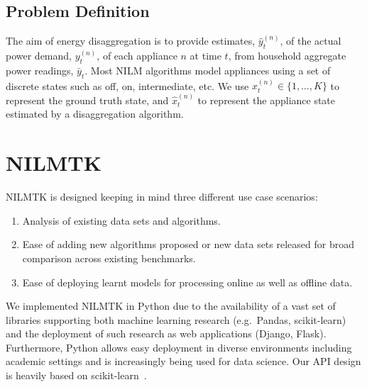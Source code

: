 \documentclass{sig-alternate}
\newcommand{\bluecolor}[1]{\textcolor{blue}{#1}}
\newcommand{\secref}[1]{Section~\ref{#1}}
\begin{document}
\subsection{Problem Definition}
\label{sec:notation}
\noindent The aim of energy disaggregation is to provide estimates, $\hat{y}^{(n)}_t$, of the actual power demand, $y^{(n)}_t$, of each appliance $n$ at time $t$, from household aggregate power readings, $\bar{y}_t$. Most NILM algorithms model appliances using a set of discrete states such as off, on, intermediate, etc.  We use $x^{(n)}_t \in \{1, \dots, K\}$ to represent the ground truth state, and $\hat{x}^{(n)}_t$ to represent the appliance state estimated by a disaggregation algorithm.

\section{NILMTK}
\label{sec:nilmtk}

\noindent
NILMTK is designed keeping in mind three different use case scenarios:
\begin{enumerate}
\item Analysis of existing data sets and algorithms.
\item Ease of adding new algorithms proposed or new data sets released for broad comparison across existing benchmarks.
\item Ease of deploying learnt models for processing online as well as offline data.
\end{enumerate}


We implemented NILMTK in Python due to the availability of a vast set of libraries supporting both machine learning research (e.g.\ Pandas, scikit-learn) and the deployment of such research as web applications (Django, Flask). Furthermore, Python allows easy deployment in diverse environments including academic settings and is increasingly being used for data science.
Our API design is heavily based on scikit-learn~\cite{scikit, scikit_api}.
\end{document}
